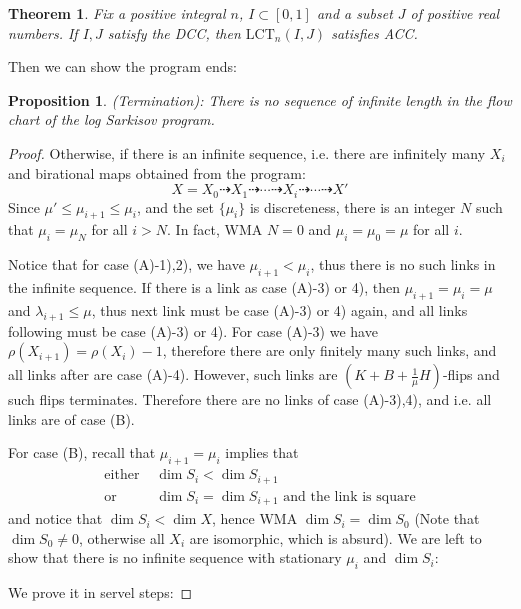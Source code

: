 \documentclass{article}
\newtheorem{prop}[defn]{Proposition}
\newtheorem{thm}[defn]{Theorem}
\begin{document}
\begin{thm}
	Fix a positive integral $ n $, $ I\subset [0,1] $ and a subset $ J $ of positive real numbers. If $ I,J $ satisfy the DCC, then $ \mathrm{LCT}_n(I,J) $ satisfies ACC.
\end{thm}

Then we can show the program ends:
\begin{prop}
	(Termination):
	There is no sequence of infinite length in the flow chart of the log Sarkisov program.
\end{prop}
\begin{proof}
	Otherwise, if there is an infinite sequence, i.e. there are infinitely many $ X_i $ and birational maps obtained from the program:
	$$ X=X_0\dashrightarrow X_1\dashrightarrow \cdots\dashrightarrow X_i \dashrightarrow\cdots\dashrightarrow X'$$
	Since $ \mu'\leqslant\mu_{i+1}\leqslant \mu_i $, and the set $ \{\mu_i\} $ is discreteness, there is an integer $ N $ such that $ \mu_i=\mu_N $ for all $ i>N $. In fact, WMA $ N=0 $ and $ \mu_i=\mu_0=\mu $ for all $ i $. 
	
	Notice that for case (A)-1),2), we have $ \mu_{i+1}<\mu_i $, thus there is no such links in the infinite sequence. If there is a link as case (A)-3) or 4), then $ \mu_{i+1}=\mu_i=\mu  $ and $ \lambda_{i+1}\leqslant \mu $, thus next link must be case (A)-3) or 4) again, and all links following must be case (A)-3) or 4). For case (A)-3) we have $ \rho(X_{i+1})=\rho(X_i)-1 $, therefore there are only finitely many such links, and all links after are  case (A)-4). However, such links are $ (K+B+\frac{1}{\mu}H) $-flips and such flips terminates. Therefore there are no links of case (A)-3),4), and i.e. all links are of case (B).
	
	For case (B), recall that $ \mu_{i+1}=\mu_i $ implies that 
	\begin{equation*}
		\begin{aligned}
			\text{either } &\dim S_i<\dim S_{i+1} \\
			\text{or }&\dim S_i=\dim S_{i+1} \text{ and the link is square} 
		\end{aligned}
	\end{equation*} 
	and notice that $ \dim S_i< \dim X $, hence WMA $ \dim S_i=\dim S_0 $ (Note that $ \dim S_0 \neq 0$, otherwise all $ X_i $ are isomorphic, which is absurd). We are left to show that there is no infinite sequence with stationary $ \mu_i $ and $ \dim S_i $:
	
	We prove it in servel steps:


\end{proof}
\end{document}
